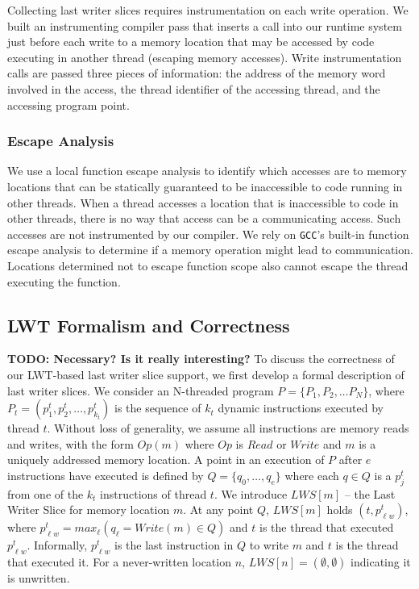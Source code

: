\documentclass[preprint,9pt]{sigplanconf}
\newcommand{\lwt}{LWT\xspace}
\begin{document}
Collecting last writer slices requires instrumentation on each write operation.
We built an instrumenting compiler pass that inserts a call into our runtime
system just before each write to a memory location that may be accessed by code
executing in another thread (escaping memory accesses).  Write instrumentation
calls are passed three pieces of information: the address of the memory word
involved in the access, the thread identifier of the accessing thread, and the
accessing program point.   

\subsubsection{Escape Analysis}
We use a local function escape analysis to identify which accesses are to
memory locations that can be statically guaranteed to be inaccessible to code
running in other threads.  When a thread accesses a location that is
inaccessible to code in other threads, there is no way that access can be a
communicating access.  Such accesses are not instrumented by our compiler.  
We rely on {\tt GCC}'s built-in function escape analysis to determine if a
memory operation might lead to communication.  Locations determined not to
escape function scope also cannot escape the thread executing the function.


\subsection{\lwt Formalism and Correctness}
{\bf TODO: Necessary?  Is it really interesting?}
\label{sec:lwssoundness}
To discuss the correctness of our \lwt-based last writer slice support, we
first develop a formal description of last writer slices.  We consider an
N-threaded program $P = \{P_1, P_2, \ldots P_N\}$, where $P_t = (p^{t}_{1},
p^{t}_{2}, \ldots, p^{t}_{k_{t}})$ is the sequence of $k_{t}$ dynamic
instructions executed by thread $t$.  Without loss of generality, we assume all
instructions are memory reads and writes, with the form $Op(m)$ where $Op$ is
$Read$ or $Write$ and $m$ is a uniquely addressed memory location.
A point in an execution of $P$ after $e$ instructions have
executed is defined by $Q = \{q_{0}, \ldots, q_{e}\}$ where each $q \in Q$ is a
$p^{t}_{j}$ from one of the $k_t$ instructions of thread $t$.  We introduce
$LWS[m]$ -- the Last Writer Slice for memory location $m$.   At any point $Q$,
$LWS[m]$ holds $(t,p^{t}_{\ell w})$, where $p^{t}_{\ell w} = max_{\ell}( 
q_{\ell} = Write(m) \in Q)$ and $t$ is the thread that
executed $p^{t}_{\ell w}$. Informally, $p^{t}_{\ell w}$ is the last instruction
in $Q$ to write $m$ and $t$ is the thread that executed it.  For a
never-written location $n$, $LWS[n] = (\emptyset,\emptyset)$ indicating it is
unwritten.
\end{document}
